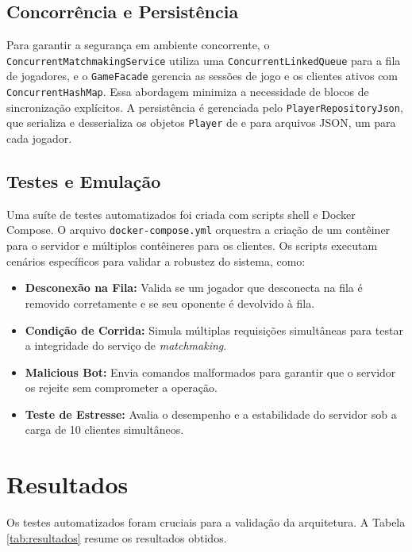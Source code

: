\documentclass[corpo=12pt,a4paper]{sbc-artigos}
\begin{document}
\subsection{Concorrência e Persistência}
Para garantir a segurança em ambiente concorrente, o \texttt{ConcurrentMatchmakingService} utiliza uma \texttt{ConcurrentLinkedQueue} para a fila de jogadores, e o \texttt{GameFacade} gerencia as sessões de jogo e os clientes ativos com \texttt{ConcurrentHashMap}. Essa abordagem minimiza a necessidade de blocos de sincronização explícitos. A persistência é gerenciada pelo \texttt{PlayerRepositoryJson}, que serializa e desserializa os objetos \texttt{Player} de e para arquivos JSON, um para cada jogador.

\subsection{Testes e Emulação}
Uma suíte de testes automatizados foi criada com scripts shell e Docker Compose. O arquivo \texttt{docker-compose.yml} orquestra a criação de um contêiner para o servidor e múltiplos contêineres para os clientes. Os scripts executam cenários específicos para validar a robustez do sistema, como:

\begin{itemize}
    \item \textbf{Desconexão na Fila:} Valida se um jogador que desconecta na fila é removido corretamente e se seu oponente é devolvido à fila.
    \item \textbf{Condição de Corrida:} Simula múltiplas requisições simultâneas para testar a integridade do serviço de \textit{matchmaking}.
    \item \textbf{Malicious Bot:} Envia comandos malformados para garantir que o servidor os rejeite sem comprometer a operação.
    \item \textbf{Teste de Estresse:} Avalia o desempenho e a estabilidade do servidor sob a carga de 10 clientes simultâneos.
\end{itemize}

\section{Resultados}
Os testes automatizados foram cruciais para a validação da arquitetura. A Tabela \ref{tab:resultados} resume os resultados obtidos.
\end{document}

